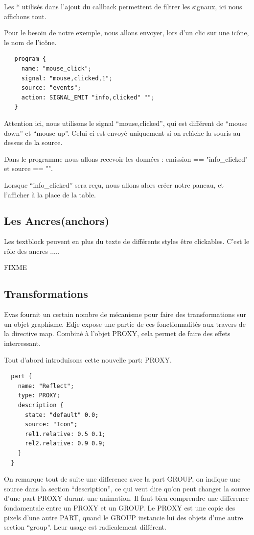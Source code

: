 \documentclass[a4paper]{efr}
\begin{document}
Les * utilisés dans l'ajout du callback permettent de filtrer les signaux, ici
nous affichons tout.

Pour le besoin de notre exemple, nous allons envoyer, lors d'un clic sur une
icône, le nom de l'icône.
\begin{lstlisting}
   program {
     name: "mouse_click";
     signal: "mouse,clicked,1";
     source: "events";
     action: SIGNAL_EMIT "info,clicked" "";
   }
\end{lstlisting}

Attention ici, nous utilisons le signal ``mouse,clicked'', qui est différent de
``mouse down'' et ``mouse up''. Celui-ci est envoyé uniquement si on relâche la souris
au dessus de la source.

Dans le programme nous allons recevoir les données : emission == "info\_clicked"
et source == "".

Lorsque ``info\_clicked'' sera reçu, nous allons alors créer notre paneau, et
l'afficher à la place de la table.

\subsection{Les Ancres(anchors)}

Les textblock peuvent en plus du texte de différents styles être clickables.
C'est le rôle des ancres .....

FIXME

\subsection{Transformations}

Evas fournit un certain nombre de mécanisme pour faire des transformations sur un
objet graphisme. Edje expose une partie de ces fonctionnalités aux travers de la
directive map. Combiné à l'objet PROXY, cela permet de faire des effets interressant.

Tout d'abord introduisons cette nouvelle part: PROXY.

\begin{lstlisting}
  part {
    name: "Reflect";
    type: PROXY;
    description {
      state: "default" 0.0;
      source: "Icon";
      rel1.relative: 0.5 0.1;
      rel2.relative: 0.9 0.9;
    }
  }
\end{lstlisting}

On remarque tout de suite une difference avec la part GROUP, on indique une source dans
la section ``description'', ce qui veut dire qu'on peut changer la source d'une part
PROXY durant une animation. Il faut bien comprendre une difference fondamentale entre un
PROXY et un GROUP. Le PROXY est une copie des pixels d'une autre PART, quand le GROUP
instancie lui des objets d'une autre section ``group''. Leur usage est radicalement
différent.
\end{document}
